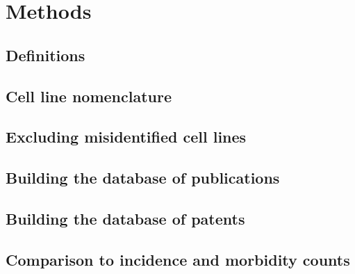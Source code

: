 \documentclass[11pt]{article}
\begin{document}
\section{Methods}

\subsection{Definitions}

\subsection{Cell line nomenclature}

\subsection{Excluding misidentified cell lines}

\subsection{Building the database of publications}

\subsection{Building the database of patents}

\subsection{Comparison to incidence and morbidity counts}
\end{document}
